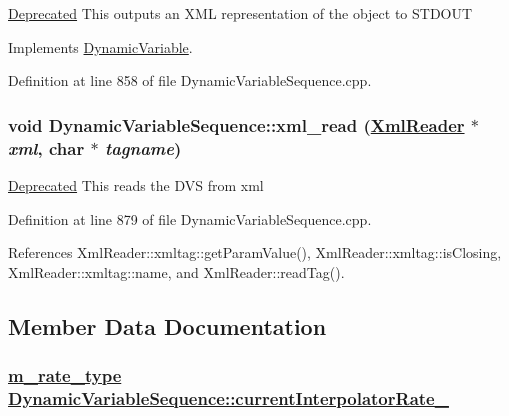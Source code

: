 \begin{Desc}
\item[\hyperlink{deprecated__deprecated000010}{Deprecated}]This outputs an XML representation of the object to STDOUT \end{Desc}


Implements \hyperlink{classDynamicVariable_a11}{Dynamic\-Variable}.

Definition at line 858 of file Dynamic\-Variable\-Sequence.cpp.\hypertarget{classDynamicVariableSequence_a29}{
\subsubsection[xml\_\-read]{\setlength{\rightskip}{0pt plus 5cm}void Dynamic\-Variable\-Sequence::xml\_\-read (\hyperlink{classXmlReader}{Xml\-Reader} $\ast$ {\em xml}, char $\ast$ {\em tagname})}}
\label{classDynamicVariableSequence_a29}


\begin{Desc}
\item[\hyperlink{deprecated__deprecated000012}{Deprecated}]This reads the DVS from xml \end{Desc}


Definition at line 879 of file Dynamic\-Variable\-Sequence.cpp.

References Xml\-Reader::xmltag::get\-Param\-Value(), Xml\-Reader::xmltag::is\-Closing, Xml\-Reader::xmltag::name, and Xml\-Reader::read\-Tag().

\subsection{Member Data Documentation}
\hypertarget{classDynamicVariableSequence_r5}{
\subsubsection[currentInterpolatorRate\_\-]{\setlength{\rightskip}{0pt plus 5cm}\hyperlink{Types_8h_a4}{m\_\-rate\_\-type} \hyperlink{classDynamicVariableSequence_r5}{Dynamic\-Variable\-Sequence::current\-Interpolator\-Rate\_\-}}}
\label{classDynamicVariableSequence_r5}


